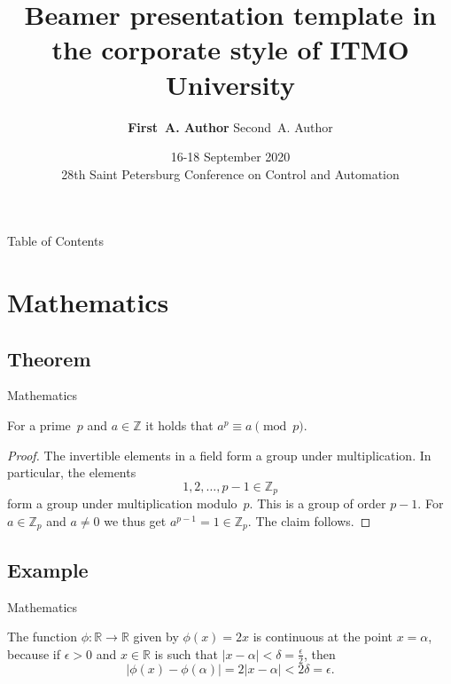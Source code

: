 \documentclass[11pt, aspectratio=169]{beamer}
\title{Beamer presentation template in the corporate style of ITMO University}
\author[Author, Another]{
    \hfill
    {\bf First~A. Author}\inst{1}
    \hfill
    Second~A. Author\inst{2}
    \hfill
}
\institute[ITMO University] %
{
    \hfill
    \begin{minipage}[t]{0.4\textwidth}
        \centering{\inst{1}%
        Faculty/Department, ITMO University}
    \end{minipage}
    \hfill
    \begin{minipage}[t]{0.4\textwidth}
        \centering{\inst{2}%
        Faculty/Department, ITMO University}
    \end{minipage}
    \hfill
 }
\date[Occasion]{16-18 September 2020 \\ 28th Saint Petersburg Conference on Control and Automation}
\begin{document}
\frame{\titlepage}

\begin{frame}{Table of Contents}
    \tableofcontents
\end{frame}

\section{Mathematics}
\subsection{Theorem}


\begin{frame}{Mathematics}
    \begin{theorem}
        For a prime~\(p\) and \(a \in \mathbb{Z}\) it holds that \(a^p \equiv a \pmod{p}\).
    \end{theorem}

    \begin{proof}
        The invertible elements in a field form a group under multiplication.
        In particular, the elements
        \begin{equation*}
            1, 2, \ldots, p - 1 \in \mathbb{Z}_p
        \end{equation*}
        form a group under multiplication modulo~\(p\).
        This is a group of order \(p - 1\).
        For \(a \in \mathbb{Z}_p\) and \(a \neq 0\) we thus get \(a^{p-1} = 1 \in \mathbb{Z}_p\).
        The claim follows.
    \end{proof}
\end{frame}


\subsection{Example}


\begin{frame}{Mathematics}
    \begin{example}
        The function \(\phi \colon \mathbb{R} \to \mathbb{R}\) given by \(\phi(x) = 2x\) is continuous at the point \(x = \alpha\),
        because if \(\epsilon > 0\) and \(x \in \mathbb{R}\) is such that \(\lvert x - \alpha \rvert < \delta = \frac{\epsilon}{2}\),
        then
        \begin{equation*}
            \lvert \phi(x) - \phi(\alpha)\rvert = 2\lvert x - \alpha \rvert < 2\delta = \epsilon.
        \end{equation*}
    \end{example}
\end{frame}
\end{document}
